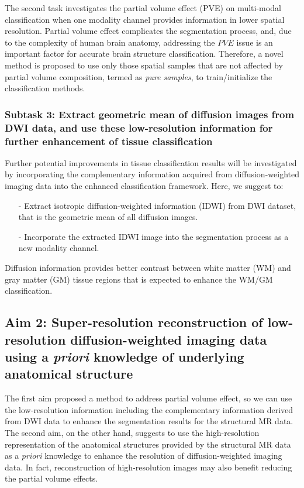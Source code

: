 The second task investigates the partial volume effect (PVE) on multi-modal classification when one modality channel provides information in lower spatial resolution. Partial volume effect complicates the segmentation process, and, due to the complexity of human brain anatomy, addressing the $PVE$ issue is an important factor for accurate brain structure classification. Therefore, a novel method is proposed to use only those spatial samples that are not affected by partial volume composition, termed as \textit{pure samples}, to train/initialize the classification methods.

\subsubsection{Subtask 3: Extract geometric mean of diffusion images from DWI data, and use these low-resolution information for further enhancement of tissue classification}

Further potential improvements in tissue classification results will be investigated by incorporating the complementary information acquired from diffusion-weighted imaging data into the enhanced classification framework. Here, we suggest to:
\begin{itemize}
    \item[-] Extract isotropic diffusion-weighted information (IDWI) from DWI dataset, that is the geometric mean of all diffusion images.
    \item[-] Incorporate the extracted IDWI image into the segmentation process as a new modality channel.
\end{itemize}

Diffusion information provides better contrast between white matter (WM) and gray matter (GM) tissue regions that is expected to enhance the WM/GM classification.
\newline

\subsection{Aim 2: Super-resolution reconstruction of low-resolution diffusion-weighted imaging data using a \emph{priori} knowledge of underlying anatomical structure}

The first aim proposed a method to address partial volume effect, so we can use the low-resolution information including the complementary information derived from DWI data to enhance the segmentation results for the structural MR data.
The second aim, on the other hand, suggests to use the high-resolution representation of the anatomical structures provided by the structural MR data as a \emph{priori} knowledge to enhance the resolution of diffusion-weighted imaging data. In fact, reconstruction of high-resolution images may also benefit reducing the partial volume effects.

